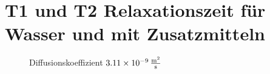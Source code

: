 \section{T1 und T2 Relaxationszeit für Wasser und mit Zusatzmitteln}
\begin{figure}[H]
    \centering
    
    \caption{Diffusionskoeffizient $\SI{3,11e-9}{\frac{\m^2}{s}}$}
\end{figure}